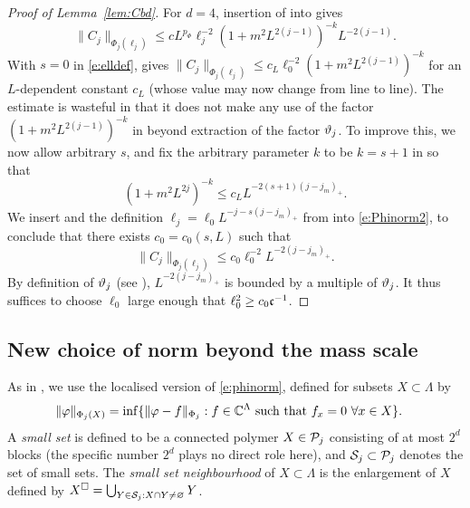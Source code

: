 \begin{proof}[Proof of Lemma~\ref{lem:Cbd}]
For $d=4$, insertion of  into  gives
\begin{equation}
    \label{e:Phinorm2}
    \|C_j\|_{\Phi_{j}(\ell_j)}
    \le
    c
    L^{p_\Phi}
    \ell_j^{-2}(1+m^2L^{2(j-1)})^{-k}
    L^{-2(j-1)}.
\end{equation}
With $s=0$ in \eqref{e:elldef},  gives
$\|C_j\|_{\Phi_{j}(\ell_j)} \le c_L \ell_0^{-2} (1+m^2L^{2(j-1)})^{-k}$
for an $L$-dependent constant $c_L$ (whose value may now change from line to line).
The estimate \cite[\eqref{IE-e:CLbd}]{BS-rg-IE}
is wasteful in that it does not make any use of the factor
$(1+m^2L^{2(j-1)})^{-k}$ in  beyond extraction of the factor $\vartheta_j$.
To improve this, we now allow arbitrary $s$, and fix the arbitrary parameter $k$ to be $k=s+1$
in  so that
\begin{equation} \label{e:mass-decay}
(1 + m^2 L^{2j})^{-k} \le c_L L^{-2(s+1)(j - j_m)_+}.
\end{equation}
We insert  and the definition $\ell_j=\ell_0 L^{-j-s(j-j_m)_+}$ from
 into
\eqref{e:Phinorm2}, to conclude that there exists $c_0 = c_0(s, L)$ such that
\begin{equation}
    \|C_j\|_{\Phi_{j}(\ell_j)} \leq c_0 \ell_0^{-2} L^{-2(j - j_m)_+}
    .
\end{equation}
By definition of $\vartheta_j$ (see \cite[Section~\ref{IE-sec:frp}]{BS-rg-IE}),
$L^{-2(j - j_m)_+}$ is bounded by a multiple of $\vartheta_j$.
It thus suffices to choose $\ell_0$ large enough that
$\ell_0^2 \ge c_0 \mathfrak{c}^{-1}$.
\end{proof}


\subsection{New choice of norm beyond the mass scale}
\label{sec:newnorm}


As in \cite[(\ref{IE-e:PhiXdef})]{BS-rg-IE}, we use the localised version
of \eqref{e:phinorm}, defined for subsets
$X \subset \Lambda$  by
\begin{align}
\label{e:PhiXdef}
    \|\varphi\|_{\Phi_j(X)}
    &=
    \inf \{ \|\varphi -f\|_{\Phi_j} :
    \text{$f \in \mathbb{C}^\Lambda$ such that $f_{x} = 0$
    $\forall x\in X$}\}.
\end{align}
A \emph{small set} is defined to be a
connected polymer $X \in \mathcal{P}_j$ consisting of at most $2^d$ blocks
(the specific number
$2^d$ plays no direct role here),
and $\mathcal{S}_j \subset \mathcal{P}_j$ denotes the set of small sets.
The \emph{small set neighbourhood} of $X \subset \Lambda $ is
the enlargement of $X$ defined by
$
    X^{\Box}
=
    \bigcup_{Y\in \mathcal{S}_{j}:X\cap Y \not =\varnothing } Y$.

